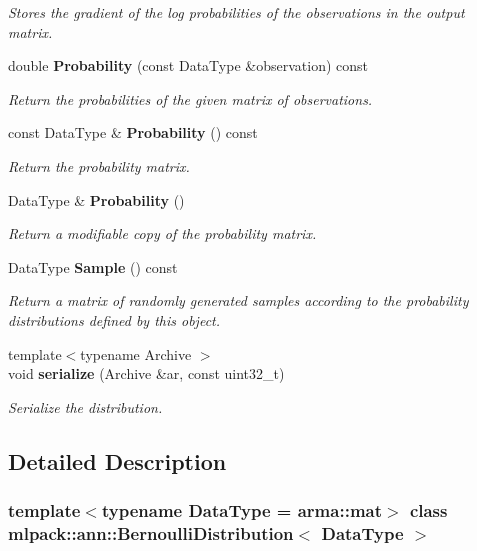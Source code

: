 \begin{DoxyCompactItemize}
\begin{DoxyCompactList}\small\item\em Stores the gradient of the log probabilities of the observations in the output matrix. \end{DoxyCompactList}\item 
double \textbf{ Probability} (const Data\+Type \&observation) const
\begin{DoxyCompactList}\small\item\em Return the probabilities of the given matrix of observations. \end{DoxyCompactList}\item 
const Data\+Type \& \textbf{ Probability} () const
\begin{DoxyCompactList}\small\item\em Return the probability matrix. \end{DoxyCompactList}\item 
Data\+Type \& \textbf{ Probability} ()
\begin{DoxyCompactList}\small\item\em Return a modifiable copy of the probability matrix. \end{DoxyCompactList}\item 
Data\+Type \textbf{ Sample} () const
\begin{DoxyCompactList}\small\item\em Return a matrix of randomly generated samples according to the probability distributions defined by this object. \end{DoxyCompactList}\item 
{\footnotesize template$<$typename Archive $>$ }\\void \textbf{ serialize} (Archive \&ar, const uint32\+\_\+t)
\begin{DoxyCompactList}\small\item\em Serialize the distribution. \end{DoxyCompactList}\end{DoxyCompactItemize}


\subsection{Detailed Description}
\subsubsection*{template$<$typename Data\+Type = arma\+::mat$>$\newline
class mlpack\+::ann\+::\+Bernoulli\+Distribution$<$ Data\+Type $>$}


